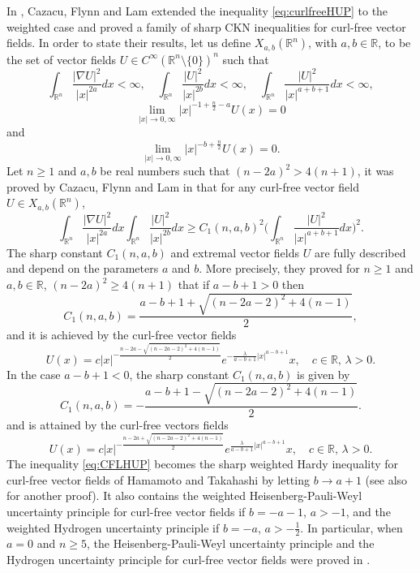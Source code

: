 \documentclass[a4paper,12pt]{article}
\theoremstyle{plain}
\theoremstyle{definition}
\theoremstyle{remark}
\def\R{\mathbb R}%
\def\irn{\int_{\R^n}}
\numberwithin{equation}{section}
\begin{document}
In \cite{CFL23}, Cazacu, Flynn and Lam extended the inequality \eqref{eq:curlfreeHUP} to the weighted case and proved a family of sharp CKN inequalities for curl-free vector fields. In order to state their results, let us define $X_{a,b}(\R^n)$, with $a,b\in \R$, to be the set of vector fields $U\in C^\infty(\R^n\setminus \{0\})^n$ such that
\[
\int_{\R^n} \frac{|\nabla U|^2}{|x|^{2a}} dx < \infty,\quad \int_{\R^n} \frac{|U|^2}{|x|^{2b}}dx < \infty,\quad \int_{\R^n} \frac{|U|^2}{|x|^{a+b +1}} dx < \infty,
\]
\[
\lim_{|x|\to 0,\infty} |x|^{-1 + \frac n2 - a} U(x) = 0
\]
and
\[
\lim_{|x|\to 0, \infty} |x|^{-b + \frac n2} U(x) = 0.
\]
Let $n\geq 1$ and $a, b$ be real numbers such that $(n-2a)^2 > 4(n+1)$, it was proved by Cazacu, Flynn and Lam in \cite{CFL23} that for any curl-free vector field $U \in X_{a,b}(\R^n)$,
\begin{equation}\label{eq:CFLHUP}
\irn \frac{|\nabla U|^2}{|x|^{2a}} dx \irn \frac{|U|^2}{|x|^{2b}} dx \geq C_1(n,a,b)^2 \Big(\irn \frac{|U|^2}{|x|^{a+b +1}} dx\Big)^2.
\end{equation}
The sharp constant $C_1(n,a,b)$ and extremal vector fields $U$ are fully described and depend on the parameters $a$ and $b$. More precisely, they proved for $n\geq 1$ and $a,b\in \R$,  $(n-2a)^2 \geq 4(n+1)$ that  if $a -b + 1 > 0$ then 
\[
C_1(n,a,b) = \frac{a-b +1 + \sqrt{(n-2a -2)^2 + 4(n-1)}}2,
\]
and it is achieved by the curl-free vector fields
\[
U(x) = c |x|^{-\frac{n -2a - \sqrt{(n-2a -2)^2 + 4(n-1)}}2} e^{-\frac{\lambda}{a-b+1} |x|^{a-b +1}} x,\quad c\in \R, \, \lambda >0.
\]
In the case $a-b +1 < 0$, the sharp constant $C_1(n,a,b)$ is given by
\[
C_1(n,a,b) = -\frac{a-b +1 - \sqrt{(n-2a -2)^2 + 4(n-1)}}2.
\]
and is attained by the curl-free vectors fields
\[
U(x) = c |x|^{-\frac{n -2a + \sqrt{(n-2a -2)^2 + 4(n-1)}}2} e^{\frac{\lambda}{a-b+1} |x|^{a-b +1}} x,\quad c \in \R,\, \lambda >0.
\]
The inequality \eqref{eq:CFLHUP} becomes the sharp weighted Hardy inequality for curl-free vector fields of Hamamoto and Takahashi \cite{HamaTaka1} by letting $b\to a+1$ (see also \cite{HamaTaka2} for another proof). It also contains the weighted Heisenberg-Pauli-Weyl uncertainty principle for curl-free vector fields if $b = -a -1$, $a > -1$, and the weighted Hydrogen uncertainty principle if $b = -a$, $a > -\frac 12$. In particular, when $a =0$ and $n\geq 5$,  the Heisenberg-Pauli-Weyl uncertainty principle and the Hydrogen uncertainty principle for curl-free vector fields were proved in \cite{CFL22}.
\end{document}
